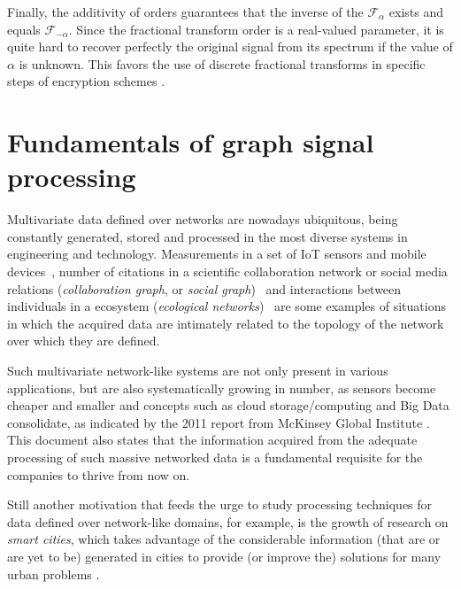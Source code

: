 Finally, the additivity of orders guarantees that the inverse of the $\mathcal{F}_\alpha$ exists and equals $\mathcal{F}_{-\alpha}$. Since the fractional transform order is a real-valued parameter, it is quite hard to recover perfectly the original signal from its spectrum if the value of $\alpha$ is unknown. This favors the use of discrete fractional transforms in specific steps of encryption schemes \cite{tao2010image, kang2018reality, kang2018color}.

\section{Fundamentals of graph signal processing}

Multivariate data defined over networks are nowadays ubiquitous, being constantly generated, stored and processed in the most diverse systems in engineering and technology. Measurements in a set of IoT sensors and mobile devices~\cite{alam2015toward,guo2016qos,ma2016non,yu2016novel}, number of citations in a scientific collaboration network or social media relations (\emph{collaboration graph}, or \emph{social graph})~\cite{chung2010graph} and interactions between individuals in a ecosystem (\emph{ecological networks})~\cite{golubski2016} are some examples of situations in which the acquired data are intimately related to the topology of the network over which they are defined.

Such multivariate network-like systems are not only present in various applications, but are also systematically growing in number, as sensors become cheaper and smaller and concepts such as cloud storage/computing and Big Data consolidate, as indicated by the 2011 report from McKinsey Global Institute \cite{mckinsey2011big}. This document also states that the information acquired from the adequate processing of such massive networked data is a fundamental requisite for the companies to thrive from now on.

Still another motivation that feeds the urge to study processing techniques for data defined over network-like domains, for example, is the growth of research on \emph{smart cities}, which takes advantage of the considerable information (that are or are yet to be) generated in cities to provide (or improve the) solutions  for many urban problems \cite{jain2014big}.

